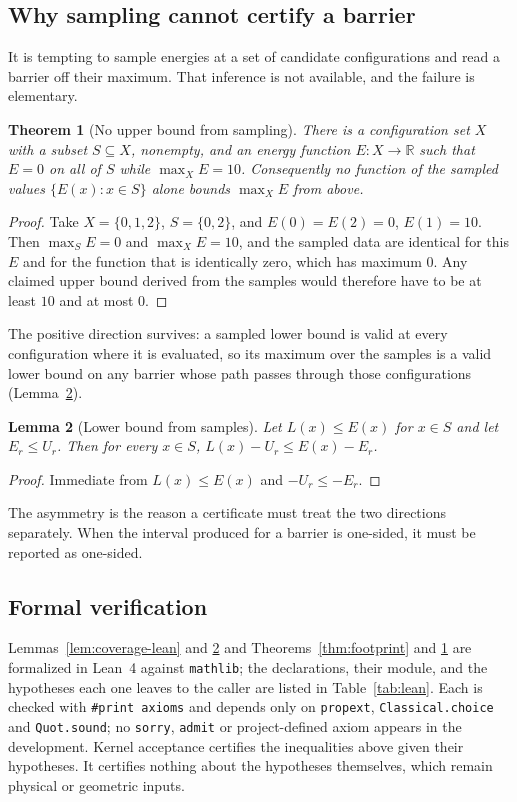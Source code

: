 \documentclass[11pt,a4paper]{article}
\theoremstyle{plain}
\newtheorem{theorem}{Theorem}[section]
\newtheorem{lemma}[theorem]{Lemma}
\theoremstyle{definition}
\theoremstyle{remark}
\newcommand{\R}{\mathbb{R}}
\begin{document}
\subsection{Why sampling cannot certify a barrier}

It is tempting to sample energies at a set of candidate configurations and read
a barrier off their maximum. That inference is not available, and the failure
is elementary.

\begin{theorem}[No upper bound from sampling]
\label{thm:nosampling}
There is a configuration set $X$ with a subset $S\subseteq X$, nonempty, and an
energy function $E:X\to\R$ such that $E=0$ on all of $S$ while
$\max_X E = 10$. Consequently no function of the sampled values
$\{E(x):x\in S\}$ alone bounds $\max_X E$ from above.
\end{theorem}
\begin{proof}
Take $X=\{0,1,2\}$, $S=\{0,2\}$, and $E(0)=E(2)=0$, $E(1)=10$. Then
$\max_S E = 0$ and $\max_X E = 10$, and the sampled data are identical for this
$E$ and for the function that is identically zero, which has maximum $0$. Any
claimed upper bound derived from the samples would therefore have to be at
least $10$ and at most $0$.
\end{proof}

The positive direction survives: a sampled lower bound is valid at every
configuration where it is evaluated, so its maximum over the samples is a valid
lower bound on any barrier whose path passes through those configurations
(Lemma~\ref{lem:sample-lower}).

\begin{lemma}[Lower bound from samples]
\label{lem:sample-lower}
Let $L(x)\le E(x)$ for $x\in S$ and let $E_r\le U_r$. Then for every $x\in S$,
$L(x)-U_r \le E(x)-E_r$.
\end{lemma}
\begin{proof}
Immediate from $L(x)\le E(x)$ and $-U_r\le-E_r$.
\end{proof}

The asymmetry is the reason a certificate must treat the two directions
separately. When the interval produced for a barrier is one-sided, it must be
reported as one-sided.

\subsection{Formal verification}

Lemmas~\ref{lem:coverage-lean} and \ref{lem:sample-lower} and
Theorems~\ref{thm:footprint} and \ref{thm:nosampling} are formalized in Lean~4
against \texttt{mathlib}; the declarations, their module, and the hypotheses
each one leaves to the caller are listed in Table~\ref{tab:lean}. Each is
checked with \texttt{\#print axioms} and depends only on \texttt{propext},
\texttt{Classical.choice} and \texttt{Quot.sound}; no \texttt{sorry},
\texttt{admit} or project-defined axiom appears in the development. Kernel
acceptance certifies the inequalities above given their hypotheses. It
certifies nothing about the hypotheses themselves, which remain physical or
geometric inputs.
\end{document}
